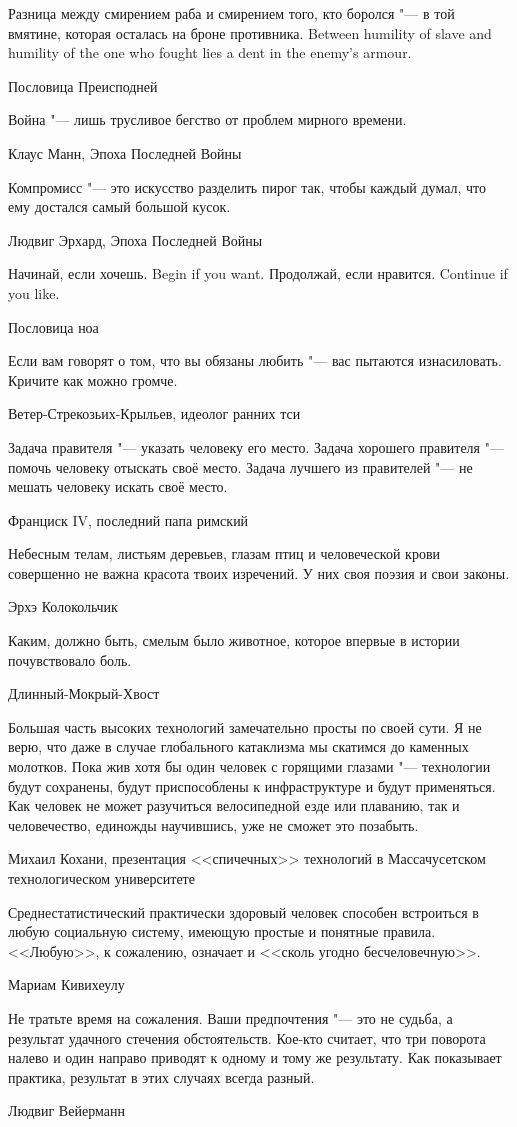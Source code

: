 \epigraph{
{Разница между смирением раба и смирением того, кто боролся "--- в той вмятине, которая осталась на броне противника.}
{Between humility of slave and humility of the one who fought lies a dent in the enemy's armour.}
}{Пословица Преисподней}

\epigraph
{Война "--- лишь трусливое бегство от проблем мирного времени.}
{Клаус Манн, Эпоха Последней Войны}

\epigraph
{Компромисс "--- это искусство разделить пирог так, чтобы каждый думал, что ему достался самый большой кусок.}
{Людвиг Эрхард, Эпоха Последней Войны}

\epigraph{
{Начинай, если хочешь.}
{Begin if you want.}
{Продолжай, если нравится.}
{Continue if you like.}
}{Пословица ноа}

\epigraph
{Если вам говорят о том, что вы обязаны любить "--- вас пытаются изнасиловать.
Кричите как можно громче.}
{Ветер-Стрекозьих-Крыльев, идеолог ранних тси}

\epigraph
{Задача правителя "--- указать человеку его место.
Задача хорошего правителя "--- помочь человеку отыскать своё место.
Задача лучшего из правителей "--- не мешать человеку искать своё место.}
{Франциск IV, последний папа римский}

\epigraph
{Небесным телам, листьям деревьев, глазам птиц и человеческой крови совершенно не важна красота твоих изречений.
У них своя поэзия и свои законы.}
{Эрхэ Колокольчик}

\epigraph
{Каким, должно быть, смелым было животное, которое впервые в истории почувствовало боль.}
{Длинный-Мокрый-Хвост}

\epigraph
{Большая часть высоких технологий замечательно просты по своей сути.
Я не верю, что даже в случае глобального катаклизма мы скатимся до каменных молотков.
Пока жив хотя бы один человек с горящими глазами "--- технологии будут сохранены, будут приспособлены к инфраструктуре и будут применяться.
Как человек не может разучиться велосипедной езде или плаванию, так и человечество, единожды научившись, уже не сможет это позабыть.}
{Михаил Кохани, презентация <<спичечных>> технологий в Массачусетском технологическом университете}

\epigraph
{Среднестатистический практически здоровый человек способен встроиться в любую социальную систему, имеющую простые и понятные правила.
<<Любую>>, к сожалению, означает и <<сколь угодно бесчеловечную>>.}
{Мариам Кивихеулу}

\epigraph
{Не тратьте время на сожаления.
Ваши предпочтения "--- это не судьба, а результат удачного стечения обстоятельств.
Кое-кто считает, что три поворота налево и один направо приводят к одному и тому же результату.
Как показывает практика, результат в этих случаях всегда разный.}
{Людвиг Вейерманн}

